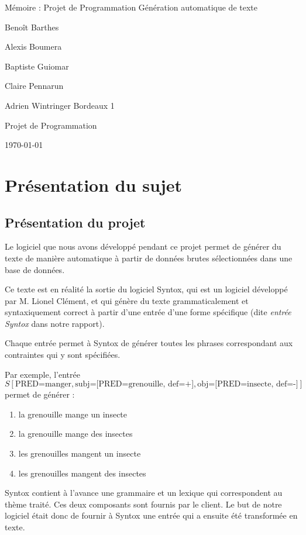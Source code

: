 \documentclass[12pt]{report}
\begin{document}
\begin{titlepage}
\begin{center}

\hfill

\bigskip
\huge{Mémoire  : Projet de Programmation} 
\vfill
\bigskip 
\Huge 
\bigskip Génération automatique de texte \par 
\vfill
\Large Benoît Barthes \par 
		Alexis Boumera \par 
		Baptiste Guiomar \par 
		Claire Pennarun \par 
		Adrien Wintringer
\vfill
\Large Bordeaux 1 \par \Large Projet de Programmation		
		\bigskip 
\bigskip

\Large
\today
\end{center}
\end{titlepage}

\tableofcontents
\newpage

\chapter{Présentation du sujet}

\section{Présentation du projet}

Le logiciel que nous avons développé pendant ce projet permet de générer du texte de manière automatique à partir de données brutes sélectionnées dans une base de données. 

\bigskip

Ce texte est en réalité la sortie du logiciel Syntox, qui est un logiciel développé par M. Lionel Clément, et qui génère du texte grammaticalement et syntaxiquement correct à partir d'une entrée d'une forme spécifique (dite \emph{entrée Syntox} dans notre rapport).

Chaque entrée permet à Syntox de générer toutes les phrases correspondant aux contraintes qui y sont spécifiées.

Par exemple, l'entrée 
$$S [\text{PRED=manger},
    \text{subj=[PRED=grenouille, def=+]},
    \text{obj=[PRED=insecte, def=-]}
]$$
permet de générer :
\begin{enumerate}
    \item la grenouille mange un insecte
    \item la grenouille mange des insectes
    \item les grenouilles mangent un insecte
    \item les grenouilles mangent des insectes
\end{enumerate}
Syntox contient à l'avance une grammaire et un lexique qui correspondent au thème traité. Ces deux composants sont fournis par le client.
Le but de notre logiciel était donc de fournir à Syntox une entrée qui a ensuite été transformée en texte.
\end{document}
